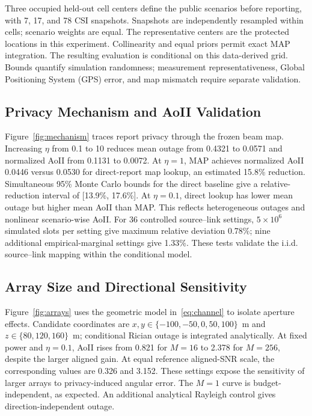 Three occupied held-out cell centers define the public scenarios before reporting, with 7, 17, and 78 CSI snapshots. Snapshots are independently resampled within cells; scenario weights are equal. The representative centers are the protected locations in this experiment. Collinearity and equal priors permit exact MAP integration. The resulting evaluation is conditional on this data-derived grid. Bounds quantify simulation randomness; measurement representativeness, Global Positioning System (GPS) error, and map mismatch require separate validation.

\subsection{Privacy Mechanism and AoII Validation}
Figure~\ref{fig:mechanism} traces report privacy through the frozen beam map. Increasing $\eta$ from 0.1 to 10 reduces mean outage from 0.4321 to 0.0571 and normalized AoII from 0.1131 to 0.0072. At $\eta=1$, MAP achieves normalized AoII 0.0446 versus 0.0530 for direct-report map lookup, an estimated 15.8\% reduction. Simultaneous 95\% Monte Carlo bounds for the direct baseline give a relative-reduction interval of [13.9\%, 17.6\%]. At $\eta=0.1$, direct lookup has lower mean outage but higher mean AoII than MAP. This reflects heterogeneous outages and nonlinear scenario-wise AoII. For 36 controlled source--link settings, $5\times10^6$ simulated slots per setting give maximum relative deviation 0.78\%; nine additional empirical-marginal settings give 1.33\%. These tests validate the i.i.d. source--link mapping within the conditional model.

\subsection{Array Size and Directional Sensitivity}
Figure~\ref{fig:arrays} uses the geometric model in~\eqref{eq:channel} to isolate aperture effects. Candidate coordinates are $x,y\in\{-100,-50,0,50,100\}$~m and $z\in\{80,120,160\}$~m; conditional Rician outage is integrated analytically. At fixed power and $\eta=0.1$, AoII rises from 0.821 for $M=16$ to 2.378 for $M=256$, despite the larger aligned gain. At equal reference aligned-SNR scale, the corresponding values are 0.326 and 3.152. These settings expose the sensitivity of larger arrays to privacy-induced angular error. The $M=1$ curve is budget-independent, as expected. An additional analytical Rayleigh control gives direction-independent outage.

